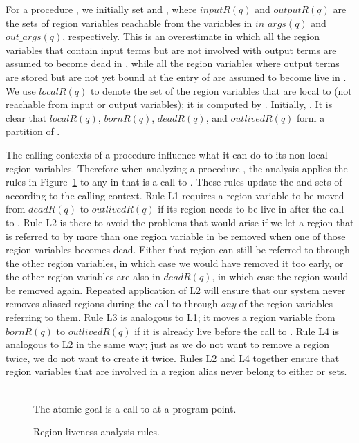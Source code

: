 \documentclass{tlp}
\newcommand{\inargs}[1]{\ensuremath{\mathit{in\_args}(#1)}}
\newcommand{\outargs}[1]{\ensuremath{\mathit{out\_args}(#1)}}
\newcommand{\bornR}[1]{\ensuremath{{bornR}(#1)}}
\newcommand{\deadR}[1]{\ensuremath{{deadR}(#1)}}
\newcommand{\localR}[1]{\ensuremath{{localR}(#1)}}
\newcommand{\inputR}[1]{\ensuremath{{inputR}(#1)}}
\newcommand{\outputR}[1]{\ensuremath{{outputR}(#1)}}
\newcommand{\outlivedR}[1]{\ensuremath{{outlivedR}(#1)}}
\begin{document}
For a procedure , we initially set
 and
,
where \inputR{q} and \outputR{q} are
the sets of region variables reachable from the variables in
\inargs{q} and \outargs{q}, respectively.
This is an overestimate in which
all the region variables that contain input terms
but are not involved with output terms
are assumed to become dead in ,
while all the region variables where output terms are stored
but are not yet bound at the entry of 
are assumed to become live in .
We use \localR{q} to denote
the set of the region variables that are local to 
(not reachable from input or output variables);
it is computed by .
Initially, .
It is clear that \localR{q}, \bornR{q}, \deadR{q}, and \outlivedR{q}
form a partition of .

The calling contexts of a procedure influence
what it can do to its non-local region variables.
Therefore when analyzing a procedure , the analysis
applies the rules in Figure~\ref{fig:lra:rules}
to any  in  that is a call to .
These rules update the  and  sets of 
according to the calling context.
Rule L1 requires
a region variable to be moved from \deadR{q} to \outlivedR{q}
if its region needs to be live in  after the call to .
Rule L2 is there to avoid the problems that would arise
if we let a region that is referred to by more than one region variable in 
be removed when one of those region variables becomes dead.
Either that region can still be referred to through the other region variables,
in which case we would have removed it too early,
or the other region variables are also in \deadR{q},
in which case the region would be removed again.
Repeated application of L2 will ensure that our system
never removes aliased regions during the call to 
through \emph{any} of the region variables referring to them.
Rule L3 is analogous to L1;
it moves a region variable from \bornR{q} to \outlivedR{q}
if it is already live before the call to .
Rule L4 is analogous to L2 in the same way;
just as we do not want to remove a region twice,
we do not want to create it twice.
Rules L2 and L4 together ensure that
region variables that are involved in a region alias
never belong to either  or  sets.

\begin{figure}[tb]
\centering
\scriptsize
\framebox{

}
\\
\small
The atomic goal  is a call to  at a program point.
\caption{Region liveness analysis rules.}
\normalsize
\label{fig:lra:rules}
\end{figure}
\end{document}
